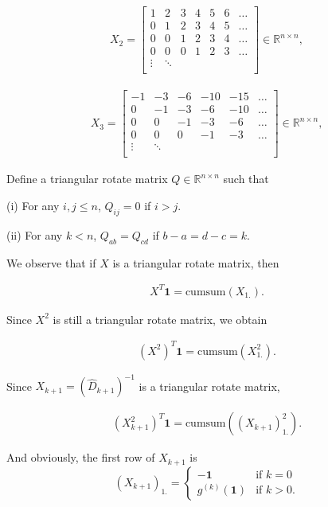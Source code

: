 \begin{align}
X_2 = \begin{bmatrix} 
    1  & 2 & 3 & 4 & 5 & 6 & \dots \\
    0  & 1 & 2 & 3 & 4 & 5 & \dots \\
    0  & 0 & 1 & 2 & 3 & 4 &\dots \\
    0  & 0 & 0 & 1 & 2 & 3 &\dots \\
    \vdots & \ddots & \\
    \end{bmatrix}
    \in \mathbb{R}^{n\times n},
\end{align}

\begin{align}
X_3 = \begin{bmatrix} 
    -1 & -3 & -6 & -10 & -15 & \dots \\
    0  & -1 & -3 & -6  & -10 & \dots \\
    0  &  0 & -1 & -3  & -6  & \dots \\
    0  &  0 & 0  & -1  & -3  & \dots \\
    \vdots & \ddots & \\
    \end{bmatrix}
    \in \mathbb{R}^{n\times n},
\end{align}

Define a triangular rotate matrix $Q \in \mathbb{R}^{n\times n}$ such that 

(i) For any $i, j \leq n$, $Q_{ij} = 0$ if $i>j$.

(ii) For any $k < n$, $Q_{ab} = Q_{cd}$ if $b-a = d-c = k$. 


We observe that if $X$ is a triangular rotate matrix, then 

\begin{align}
X^T \bm{1} = \text{cumsum}(X_{1.}).
\end{align}

Since $X^2$ is still a triangular rotate matrix, we obtain

\begin{align}
(X^2)^T \bm{1} = \text{cumsum}(X^2_{1.}).
\end{align}

Since $X_{k+1} = (\hat{D}_{k+1})^{-1}$ is a triangular rotate matrix, 

\begin{align}
(X_{k+1}^2)^T \bm{1} = \text{cumsum}((X_{k+1})_{1.}^2).
\end{align}

And obviously, the first row of $X_{k+1}$ is 
\begin{equation}
 (X_{k+1})_{1.} = 
    \begin{cases} 
      \bm{-1} & \text{if } k = 0 \\
      g^{(k)}(\bm{1}) & \text{if } k > 0.
   \end{cases}
\end{equation}

